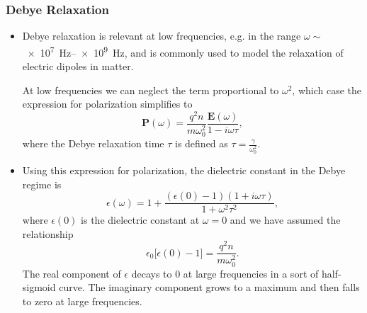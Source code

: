 \documentclass[11pt, a4paper]{article}
\renewcommand{\vec}[1]{\bm{#1}} %
\newcommand{\E}{\vec{E}} %
\renewcommand{\P}{\vec{P}}  %
\newcommand{\ee}{\epsilon_{0}}  %
\begin{document}
\subsubsection{Debye Relaxation}
\begin{itemize}
    \item Debye relaxation is relevant at low frequencies, e.g. in the range $ \omega \sim $ \SIrange{e7}{e9}{\hertz}, and is commonly used to model the relaxation of electric dipoles in matter.

    At low frequencies we can neglect the term proportional to $ \omega^{2} $, which case the expression for polarization simplifies to
    \begin{equation*}
        \P(\omega) = \frac{q^{2}n}{m\omega_{0}^{2}} \frac{\E(\omega)}{1 - i\omega\tau},
    \end{equation*}
    where the Debye relaxation time $ \tau $ is defined as $ \tau = \frac{\gamma}{\omega_{0}^{2}} $.
    
    \item Using this expression for polarization, the dielectric constant in the Debye regime is
    \begin{equation*}
        \epsilon(\omega) = 1 + \frac{(\epsilon(0) -1)(1 + i\omega\tau)}{1 + \omega^{2}\tau^{2}},
    \end{equation*}
    where $ \epsilon(0) $ is the dielectric constant at $ \omega = 0 $ and we have assumed the relationship
    \begin{equation*}
        \ee \big[ \epsilon(0) -1 \big] = \frac{q^{2}n}{m\omega_{0}^{2}}.
    \end{equation*}
    The real component of $ \epsilon $ decays to 0 at large frequencies in a sort of half-sigmoid curve. The imaginary component grows to a maximum and then falls to zero at large frequencies.
\end{itemize}
\end{document}
